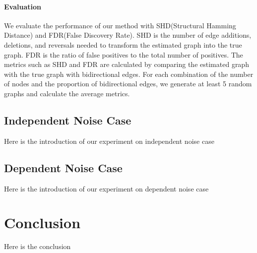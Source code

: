 \documentclass[10pt]{article}
\begin{document}
\paragraph*{Evaluation} We evaluate the performance of our method with SHD(Structural Hamming Distance) and FDR(False Discovery Rate). SHD is the number of edge additions, deletions, and reversals needed to transform the estimated graph into the true graph. FDR is the ratio of false positives to the total number of positives. The metrics such as SHD and FDR are calculated by comparing the estimated graph with the true graph with bidirectional edges. For each combination of the number of nodes and the proportion of bidirectional edges, we generate at least 5 random graphs and calculate the average metrics.\\

\subsection{Independent Noise Case}

Here is the introduction of our experiment on independent noise case

\subsection{Dependent Noise Case}

Here is the introduction of our experiment on dependent noise case

\section{Conclusion}

Here is the conclusion



\end{document}
